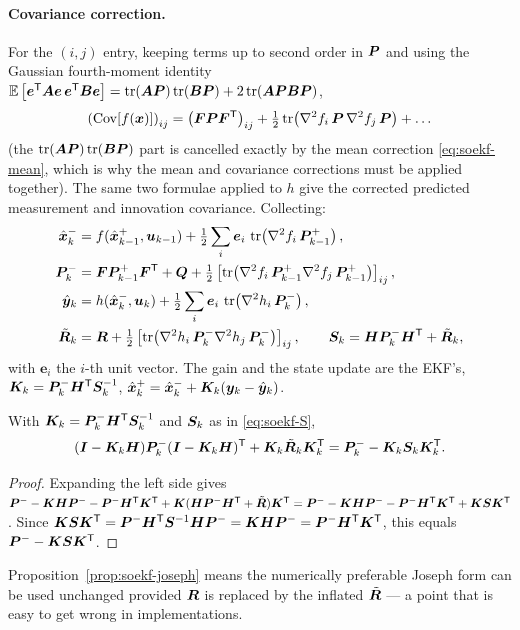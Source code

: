 \paragraph{Covariance correction.} For the $(i,j)$ entry, keeping terms up to second order in
$\bm{P}$ and using the Gaussian fourth-moment identity
$\mathbb{E}\left[\bm e^{\mathsf{T}}\bm{A}\bm e\,\bm e^{\mathsf{T}}\bm{B}\bm e\right] = \operatorname{tr}(\bm{A}\bm{P})\operatorname{tr}(\bm{B}\bm{P}) + 2\operatorname{tr}(\bm{A}\bm{P}\bm{B}\bm{P})$,
\begin{equation}
\left(\operatorname{Cov}[f(\vx)]\right)_{ij}
= \left(\mF\mP\mF^\T\right)_{ij} + \tfrac12\tr\!\left(\nabla^2f_i\,\mP\,\nabla^2f_j\,\mP\right) + \dots
\label{eq:soekf-cov}
\end{equation}
(the $\operatorname{tr}(\bm{A}\bm{P})\operatorname{tr}(\bm{B}\bm{P})$ part is cancelled exactly by the mean correction
\eqref{eq:soekf-mean}, which is why the mean and covariance corrections must be applied
together). The same two formulae applied to $h$ give the corrected predicted measurement and
innovation covariance. Collecting:
\begin{align}
\hat{\bm{x}}^{-}_k &= f(\hat{\bm{x}}^{+}_{k-1},\bm{u}_{k-1}) + \tfrac12\sum_i \bm{e}_i\,\operatorname{tr}\!\left(\nabla^2f_i\,\bm{P}^{+}_{k-1}\right),
\label{eq:soekf-tu-mean}\\
\bm{P}^{-}_k &= \bm{F}\bm{P}^{+}_{k-1}\bm{F}^{\mathsf{T}} + \bm{Q}
 + \tfrac12\left[\operatorname{tr}\!\left(\nabla^2f_i\,\bm{P}^{+}_{k-1}\nabla^2f_j\,\bm{P}^{+}_{k-1}\right)\right]_{ij},
\label{eq:soekf-tu-cov}\\
\hat{\bm{y}}_k &= h(\hat{\bm{x}}^{-}_k,\bm{u}_k) + \tfrac12\sum_i \bm{e}_i\,\operatorname{tr}\!\left(\nabla^2h_i\,\bm{P}^{-}_k\right),
\label{eq:soekf-ymean}\\
\tilde{\bm{R}}_k &= \bm{R} + \tfrac12\left[\operatorname{tr}\!\left(\nabla^2h_i\,\bm{P}^{-}_k\nabla^2h_j\,\bm{P}^{-}_k\right)\right]_{ij},
\qquad \bm{S}_k = \bm{H}\bm{P}^{-}_k\bm{H}^{\mathsf{T}} + \tilde{\bm{R}}_k,
\label{eq:soekf-S}
\end{align}
with $\bm e_i$ the $i$-th unit vector. The gain and the state update are the EKF's,
$\bm{K}_k = \bm{P}^{-}_k\bm{H}^{\mathsf{T}}\bm{S}_k^{-1}$, $\hat{\bm{x}}^{+}_k = \hat{\bm{x}}^{-}_k + \bm{K}_k(\bm{y}_k-\hat{\bm{y}}_k)$.

\begin{proposition}\label{prop:soekf-joseph}
With $\bm{K}_k = \bm{P}^{-}_k\bm{H}^{\mathsf{T}}\bm{S}_k^{-1}$ and $\bm{S}_k$ as in \eqref{eq:soekf-S},
\begin{equation}
(\bm{I}-\bm{K}_k\bm{H})\bm{P}^{-}_k(\bm{I}-\bm{K}_k\bm{H})^{\mathsf{T}} + \bm{K}_k\tilde{\bm{R}}_k\bm{K}_k^{\mathsf{T}}
= \bm{P}^{-}_k - \bm{K}_k\bm{S}_k\bm{K}_k^{\mathsf{T}} .
\label{eq:soekf-joseph}
\end{equation}
\end{proposition}
\begin{proof}
Expanding the left side gives
$\bm{P}^{-} - \bm{K}\bm{H}\bm{P}^{-} - \bm{P}^{-}\bm{H}^{\mathsf{T}}\bm{K}^{\mathsf{T}} + \bm{K}(\bm{H}\bm{P}^{-}\bm{H}^{\mathsf{T}}+\tilde{\bm{R}})\bm{K}^{\mathsf{T}}
= \bm{P}^{-} - \bm{K}\bm{H}\bm{P}^{-} - \bm{P}^{-}\bm{H}^{\mathsf{T}}\bm{K}^{\mathsf{T}} + \bm{K}\bm{S}\bm{K}^{\mathsf{T}}$. Since
$\bm{K}\bm{S}\bm{K}^{\mathsf{T}} = \bm{P}^{-}\bm{H}^{\mathsf{T}}\bm{S}^{-1}\bm{H}\bm{P}^{-} = \bm{K}\bm{H}\bm{P}^{-} = \bm{P}^{-}\bm{H}^{\mathsf{T}}\bm{K}^{\mathsf{T}}$, this
equals $\bm{P}^{-} - \bm{K}\bm{S}\bm{K}^{\mathsf{T}}$.
\end{proof}
Proposition~\ref{prop:soekf-joseph} means the numerically preferable Joseph form can be used
unchanged provided $\bm{R}$ is replaced by the inflated $\tilde{\bm{R}}$ --- a point that is easy to
get wrong in implementations.


